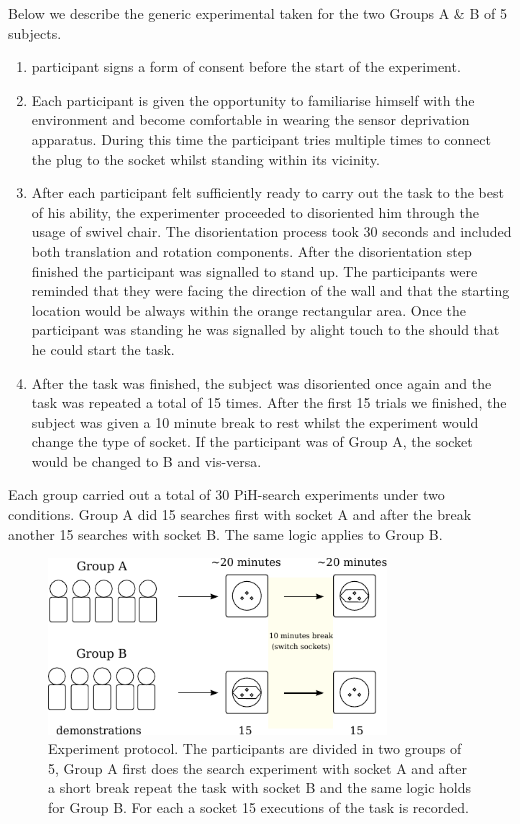 Below we describe the generic experimental taken for the two Groups A \& B of 5 subjects. 

\begin{enumerate}
 \item participant signs a form of consent before the start of the experiment.
 \item Each participant is given the opportunity to familiarise himself with the environment and become comfortable in wearing the sensor deprivation apparatus.
 During this time the participant tries multiple times to connect the plug to the socket whilst standing within its vicinity.  
 \item After each participant felt sufficiently ready to carry out the task to the best of his ability, the experimenter proceeded to disoriented
  him through the usage of swivel chair. The disorientation process took 30 seconds and included both translation and rotation components.
  After the disorientation step finished the participant was signalled to stand up. The participants were reminded that they were facing the direction of 
  the wall and that the starting location would be always within the orange rectangular area.  Once the participant was standing he was signalled 
  by alight touch to the should that he could start the task.
  \item After the task was finished, the subject was disoriented once again and the task was repeated a total of 15 times. After the first 15 
  trials we finished, the subject was given a 10 minute break to rest whilst the experiment would change the type of socket. If the participant
  was of Group A, the socket would be changed to B and vis-versa.
\end{enumerate}

Each group carried out a total of 30 PiH-search experiments under two conditions. Group A did 15 searches first with socket A and after the break 
another 15 searches with socket B. The same logic applies to Group B.

\begin{figure}
\centering
 \includegraphics[width=0.8\textwidth]{./ch4-PiH/Figures/Fig/experiment_design_v2.pdf}
 \caption{Experiment protocol. The participants are divided in two groups of 5, Group A first does the search 
 experiment with socket A and after a short break repeat the task with socket B and the same logic holds for Group B.
 For each a socket 15 executions of the task is recorded.}
 \label{fig:experiment_design}
\end{figure}

